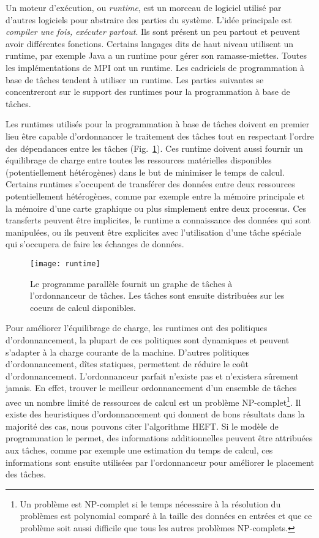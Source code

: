 Un moteur d'exécution, ou {\em runtime}, est un morceau de logiciel utilisé par d'autres logiciels pour abstraire des parties du système.
%
L'idée principale est {\em compiler une fois, exécuter partout}.
%
Ils sont présent un peu partout et peuvent avoir différentes fonctions.
%
Certains langages dits de haut niveau utilisent un runtime, par exemple Java a un runtime pour gérer son ramasse-miettes.
%
Toutes les implémentations de MPI ont un runtime.
%
Les cadriciels de programmation à base de tâches tendent à utiliser un runtime.
%
Les parties suivantes se concentreront sur le support des runtimes pour la programmation à base de tâches.


Les runtimes utilisés pour la programmation à base de tâches doivent en premier lieu être capable d'ordonnancer le traitement des tâches tout en respectant l'ordre des dépendances entre les tâches (Fig.~\ref{fig:runtime}).
%
Ces runtime doivent aussi fournir un équilibrage de charge entre toutes les ressources matérielles disponibles (potentiellement hétérogènes) dans le but de minimiser le temps de calcul.
%
Certains runtimes s'occupent de transférer des données entre deux ressources potentiellement hétérogènes, comme par exemple entre la mémoire principale et la mémoire d'une carte graphique ou plus simplement entre deux processus.
%
Ces transferts peuvent être implicites, le runtime a connaissance des données qui sont manipulées, ou ils peuvent être explicites avec l'utilisation d'une tâche spéciale qui s'occupera de faire les échanges de données.

\begin{figure}
  \centering
  \texttt{[image: runtime]}
  \caption{Le programme parallèle fournit un graphe de tâches à l'ordonnanceur de tâches. Les tâches sont ensuite distribuées sur les coeurs de calcul disponibles.}
  \label{fig:runtime}
\end{figure}


Pour améliorer l'équilibrage de charge, les runtimes ont des politiques d'ordonnancement, la plupart de ces politiques sont dynamiques et peuvent s'adapter à la charge courante de la machine.
%
D'autres politiques d'ordonnancement, dîtes statiques, permettent de réduire le coût d'ordonnancement.
%
L'ordonnanceur parfait n'existe pas et n'existera sûrement jamais.
%
En effet, trouver le meilleur ordonnancement d'un ensemble de tâches avec un nombre limité de ressources de calcul est un problème NP-complet\footnote{Un problème est NP-complet si le temps nécessaire à la résolution du problèmes est polynomial comparé à la taille des données en entrées et que ce problème soit aussi difficile que tous les autres problèmes NP-complets.}.
%
Il existe des heuristiques d'ordonnancement qui donnent de bons résultats dans la majorité des cas, nous pouvons citer l'algorithme HEFT\cite{heft}.
%
Si le modèle de programmation le permet, des informations additionnelles peuvent être attribuées aux tâches, comme par exemple une estimation du temps de calcul, ces informations sont ensuite utilisées par l'ordonnanceur pour améliorer le placement des tâches.


